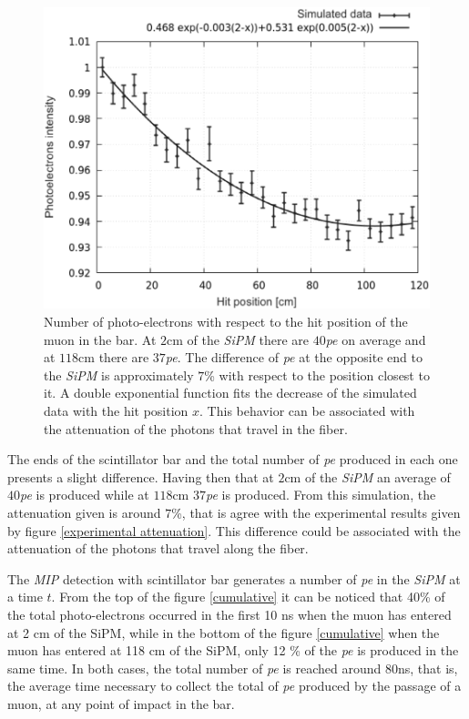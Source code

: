 \documentclass[submitting]{nst}
\begin{document}
\begin{figure}[h!]
    \centering
        \includegraphics[scale=0.41]{Figures/atenuacion_barra_2.png}
   \caption{Number of photo-electrons with respect to the hit position of the muon in the bar. At $2$cm of the \textsl{SiPM} there are $40$\textsl{pe} on average and at $118$cm there are $37$\textsl{pe}. The difference of \textsl{pe} at the opposite end to the \textsl{SiPM} is approximately $7$\% with respect to the position closest to it. A double exponential function fits the decrease of the simulated data with the hit position $x$. This behavior can be associated with the attenuation of the photons that travel in the fiber.}\label{atenuacion_barra}
\end{figure}

The ends of the scintillator bar and the total number of \textsl{pe} produced in each one presents a slight difference. Having then that at $2$cm of the \textsl{SiPM} an average of $40$\textsl{pe} is produced while at $118$cm $37$\textsl{pe} is produced. From this simulation, the attenuation given is around $7$\%, that is agree with the experimental results given by figure \ref{experimental attenuation}. This difference could be associated with the attenuation of the photons that travel along the fiber.

The \textsl{MIP} detection with scintillator bar generates a number of \textsl{pe} in the \textsl{SiPM} at a time $t$. From the top of the figure \ref{cumulative} it can be noticed that 40\% of the total photo-electrons occurred in the first 10 ns when the muon has entered at 2 cm of the SiPM, while in the bottom of the figure \ref{cumulative} when the muon has entered at 118 cm of the SiPM, only 12 \% of the \textsl{pe} is produced in the same time. In both cases, the total number of \textsl{pe} is reached around $80$ns, that is, the average time necessary to collect the total of \textsl{pe} produced by the passage of a muon, at any point of impact in the bar.
\end{document}
